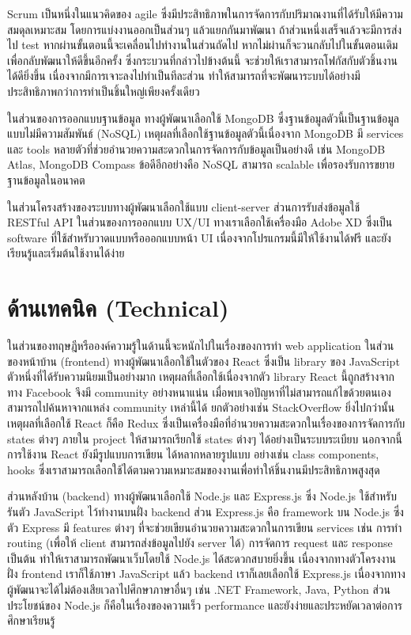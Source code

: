 Scrum เป็นหนึ่งในแนวคิดของ agile ซึ่งมีประสิทธิภาพในการจัดการกับปริมาณงานที่ได้รับให้มีความสมดุลเหมาะสม  โดยการแบ่งงานออกเป็นส่วนๆ แล้วแยกกันมาพัฒนา  ถ้าส่วนหนึ่งเสร็จแล้วจะมีการส่งไป test  หากผ่านขั้นตอนนี้จะเคลื่อนไปทำงานในส่วนถัดไป  หากไม่ผ่านก็จะวนกลับไปในขั้นตอนเดิมเพื่อกลับพัฒนาให้ดีขึ้นอีกครั้ง ซึ่งกระบวนที่กล่าวไปข้างต้นนี้  จะช่วยให้เราสามารถโฟกัสกับตัวชิ้นงานได้ดียิ่งขึ้น เนื่องจากมีการเจาะลงไปทำเป็นทีละส่วน ทำให้สามารถที่จะพัฒนาระบบได้อย่างมีประสิทธิภาพกว่าการทำเป็นชิ้นใหญ่เพียงครั้งเดียว


ในส่วนของการออกแบบฐานข้อมูล ทางผู้พัฒนาเลือกใช้ MongoDB \cite{MongoDB} ซึ่งฐานข้อมูลตัวนี้เป็นฐานข้อมูลแบบไม่มีความสัมพันธ์ (NoSQL) 
เหตุผลที่เลือกใช้ฐานข้อมูลตัวนี้เนื่องจาก MongoDB มี services และ tools หลายตัวที่ช่วยอำนวยความสะดวกในการจัดการกับข้อมูลเป็นอย่างดี เช่น MongoDB Atlas, MongoDB Compass 
ข้อดีอีกอย่างคือ NoSQL สามารถ scalable เพื่อรองรับการขยายฐานข้อมูลในอนาคต 

ในส่วนโครงสร้างของระบบทางผู้พัฒนาเลือกใช้แบบ client-server \cite{Client-Server} ส่วนการรับส่งข้อมูลใช้ RESTful API \cite{RESTFUL}
ในส่วนของการออกแบบ UX/UI ทางเราเลือกใช้เครื่องมือ Adobe XD \cite{AdobeXD} ซึ่งเป็น software ที่ใช้สำหรับวาดแบบหรือออกแบบหน้า UI เนื่องจากโปรแกรมนี้มีให้ใช้งานได้ฟรี และยังเรียนรู้และเริ่มต้นใช้งานได้ง่าย 
  

\section{ด้านเทคนิค (Technical)}
ในส่วนของทฤษฎีหรือองค์ความรู้ในด้านนี้จะหนักไปในเรื่องของการทำ
web application ในส่วนของหน้าบ้าน (frontend) ทางผู้พัฒนาเลือกใช้ในตัวของ
React \cite{React} ซึ่งเป็น library ของ JavaScript ตัวหนึ่งที่ได้รับความนิยมเป็นอย่างมาก เหตุผลที่เลือกใช้เนื่องจากตัว library React นี้ถูกสร้างจากทาง Facebook 
จึงมี community อย่างหนาแน่น  เมื่อพบเจอปัญหาที่ไม่สามารถแก้ไขด้วยตนเอง สามารถไปค้นหาจากแหล่ง community เหล่านี้ได้ ยกตัวอย่างเช่น StackOverflow 
ยิ่งไปกว่านั้น เหตุผลที่เลือกใช้ React ก็คือ Redux \cite{Redux} ซึ่งเป็นเครื่องมือที่อำนวยความสะดวกในเรื่องของการจัดการกับ states ต่างๆ  ภายใน project ให้สามารถเรียกใช้ states ต่างๆ ได้อย่างเป็นระบบระเบียบ นอกจากนี้ การใช้งาน React ยังมีรูปแบบการเขียน
ได้หลากหลายรูปแบบ อย่างเช่น class components, hooks ซึ่งเราสามารถเลือกใช้ได้ตามความเหมาะสมของงานเพื่อทำให้ชิ้นงานมีประสิทธิภาพสูงสุด


ส่วนหลังบ้าน (backend) ทางผู้พัฒนาเลือกใช้ Node.js \cite{NodeJs}
และ Express.js \cite{Express} ซึ่ง Node.js ใช้สำหรับรันตัว JavaScript ไว้ทำงานบนฝั่ง backend ส่วน Express.js คือ  framework บน Node.js 
ซึ่งตัว Express มี features ต่างๆ  ที่จะช่วยเขียนอำนวยความสะดวกในการเขียน services เช่น การทำ routing (เพื่อให้ client สามารถส่งข้อมูลไปยัง server ได้) การจัดการ request และ response เป็นต้น  ทำให้เราสามารถพัฒนาเว็บโดยใช้ Node.js ได้สะดวกสบายยิ่งขึ้น
เนื่องจากทางตัวโครงงานฝั่ง frontend เราก็ใช้ภาษา JavaScript แล้ว backend เราก็เลยเลือกใช้ Express.js  เนื่องจากทางผู้พัฒนาจะได้ไม่ต้องเสียเวลาไปศึกษาภาษาอื่นๆ เช่น .NET Framework, Java, Python 
ส่วนประโยชน์ของ Node.js ก็คือในเรื่องของความเร็ว performance และยังง่ายและประหยัดเวลาต่อการศึกษาเรียนรู้


